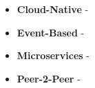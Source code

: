   \begin{itemize}
    \item \textbf{Cloud-Native} - 
    \item \textbf{Event-Based} - 
    \item \textbf{Microservices} - 
    \item \textbf{Peer-2-Peer} - 
  \end{itemize}

\newpage